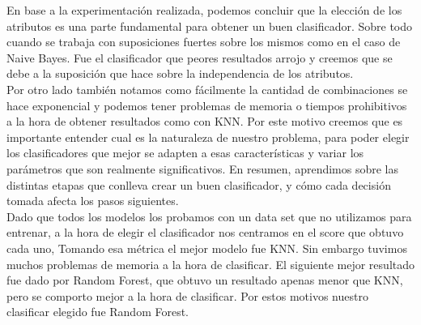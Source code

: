 En base a la experimentación realizada, podemos concluir que la elección de los atributos es una parte fundamental para obtener un buen clasificador. Sobre todo cuando se trabaja con suposiciones fuertes sobre los mismos como en el caso de Naive Bayes. Fue el clasificador que peores resultados arrojo y creemos que se debe a la suposición que hace sobre la independencia de los atributos. \\


Por otro lado también notamos como fácilmente la cantidad de combinaciones se hace exponencial y podemos tener problemas de memoria o tiempos prohibitivos a la hora de obtener resultados como con KNN. Por este motivo creemos que es importante entender cual es la naturaleza de nuestro problema, para poder elegir los clasificadores que mejor se adapten a esas características y variar los parámetros que son realmente significativos. En resumen, aprendimos sobre las distintas etapas que conlleva crear un buen clasificador, y cómo cada decisión tomada afecta los pasos siguientes.\\


Dado que todos los modelos los probamos con un data set que no utilizamos para entrenar, a la hora de elegir el clasificador nos centramos en el score que obtuvo cada uno,  Tomando esa métrica el mejor modelo fue KNN. Sin embargo tuvimos muchos problemas de memoria a la hora de clasificar. El siguiente mejor resultado fue dado por Random Forest, que obtuvo un resultado apenas menor que KNN, pero se comporto mejor a la hora de clasificar. Por estos motivos nuestro clasificar elegido fue Random Forest.\\

